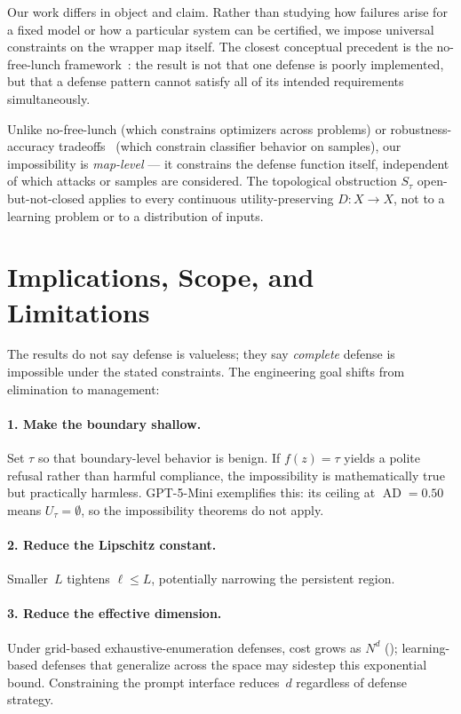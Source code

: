 \documentclass[11pt]{article}
\newcommand{\AD}{\operatorname{AD}}
\begin{document}
Our work differs in object and claim. Rather than studying how failures
arise for a fixed model or how a particular system can be certified, we
impose universal constraints on the wrapper map itself. The closest
conceptual precedent is the no-free-lunch
framework~\cite{wolpert1997no}: the result is not that one defense is
poorly implemented, but that a defense pattern cannot satisfy all of
its intended requirements simultaneously.

Unlike no-free-lunch (which constrains optimizers across problems) or
robustness-accuracy tradeoffs~\cite{tsipras2018robustness} (which
constrain classifier behavior on samples), our impossibility is
\emph{map-level} --- it constrains the defense function itself,
independent of which attacks or samples are considered. The
topological obstruction $S_\tau$ open-but-not-closed applies to every
continuous utility-preserving $D\colon X \to X$, not to a learning
problem or to a distribution of inputs.

\section{Implications, Scope, and Limitations}
\label{app:engineering}

The results do not say defense is valueless; they say \emph{complete}
defense is impossible under the stated constraints. The engineering
goal shifts from elimination to management:

\paragraph{1. Make the boundary shallow.}
Set $\tau$ so that boundary-level behavior is benign. If $f(z) = \tau$
yields a polite refusal rather than harmful compliance, the
impossibility is mathematically true but practically harmless.
GPT-5-Mini exemplifies this: its ceiling at $\AD = 0.50$ means
$U_\tau = \emptyset$, so the impossibility theorems do not apply.

\paragraph{2. Reduce the Lipschitz constant.}
Smaller~$L$ tightens $\ell \leq L$, potentially narrowing the persistent region.

\paragraph{3. Reduce the effective dimension.}
Under grid-based exhaustive-enumeration defenses, cost grows as $N^d$
(); learning-based defenses that generalize across the
space may sidestep this exponential bound. Constraining the prompt
interface reduces~$d$ regardless of defense strategy.
\end{document}
